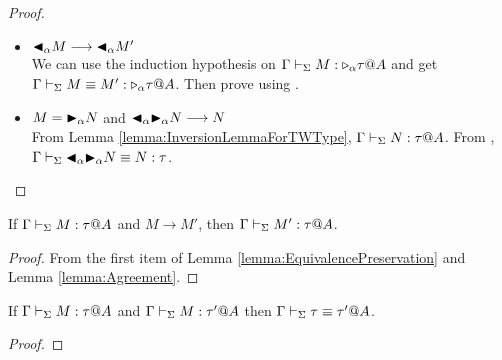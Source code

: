 \begin{proof}
\begin{itemize}
            \begin{itemize}
                \item \( {\mathop{\blacktriangleleft}}_{\alpha}M \longrightarrow {\mathop{\blacktriangleleft}}_{\alpha}M' \) \\
                    We can use the induction hypothesis on \( \G\V M:\TW_{\alpha}\tau@A \) and get \( \G \V M \E M' : \TW_{\alpha}\tau@A \). Then prove using \QTBL.
                \item \( M = {\mathop{\blacktriangleright}}_\alpha N \) and \( {\mathop{\blacktriangleleft}}_{\alpha}{\mathop{\blacktriangleright}}_\alpha N \longrightarrow N \) \\
                    From Lemma \ref{lemma:InversionLemmaForTWType}, \( \Gamma \vdash_\Sigma N
                    : \tau @ A \). From \QTBLTB, \( \Gamma \vdash_\Sigma
                    {\mathop{\blacktriangleleft}}_{\alpha}{\mathop{\blacktriangleright}}_\alpha N \equiv N : \tau \).
            \end{itemize}
    \end{itemize}
\end{proof}

\begin{theorem}
    \label{theorem:TypePreservation}
    If \( \Gamma \vdash_\Sigma M : \tau @ A \) and \( M \longrightarrow M' \), then \( \Gamma \vdash_\Sigma M' : \tau @ A \).
\end{theorem}

\begin{proof}
    From the first item of Lemma \ref{lemma:EquivalencePreservation} and Lemma \ref{lemma:Agreement}.
\end{proof}

\begin{lemma}
    \label{lemma:TypesOfTheSameTerm}
    If \( \Gamma \vdash_\Sigma M : \tau @ A \) and \( \Gamma \vdash_\Sigma M : \tau' @ A \) then \( \Gamma \vdash_\Sigma \tau \equiv \tau' @ A \).
\end{lemma}

\begin{proof}
\end{proof}

